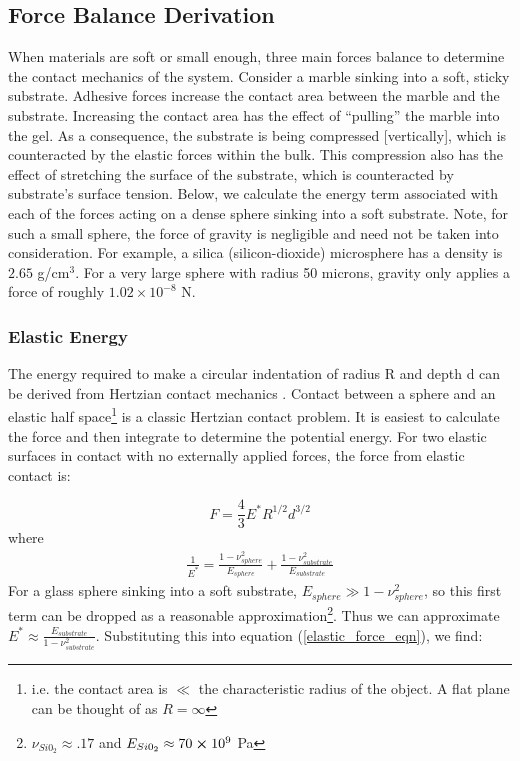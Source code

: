 \subsection{Force Balance Derivation}
When materials are soft or small enough, three main forces balance to determine the contact mechanics of the system. Consider a marble sinking into a soft, sticky substrate. Adhesive forces increase the contact area between the marble and the substrate. Increasing the contact area has the effect of ``pulling'' the marble into the gel. As a consequence, the substrate is being compressed [vertically], which is counteracted by the elastic forces within the bulk. This compression also has the effect of stretching the surface of the substrate, which is counteracted by substrate's surface tension. Below, we calculate the energy term associated with each of the forces acting on a dense sphere sinking into a soft substrate. Note, for such a small sphere, the force of gravity is negligible and need not be taken into consideration. For example, a silica (silicon-dioxide) microsphere has a density is $2.65$ g/cm$^3$. For a very large sphere with radius 50 microns, gravity only applies a force of roughly $ 1.02 \times 10^{-8} $ N.

\subsubsection{Elastic Energy}
The energy required to make a circular indentation of radius R and depth d can be derived from Hertzian contact mechanics \cite{hertz1882uber, style2013surface,cao2016nanoparticles}. Contact between a sphere and an elastic half space\footnote{i.e. the contact area is $ \ll $ the characteristic radius of the object. A flat plane can be thought of as $ R = \infty $}   is a classic Hertzian contact problem. It is easiest to calculate the force and then integrate to determine the potential energy. For two elastic surfaces in contact with no externally applied forces, the force from elastic contact is:

\begin{equation}
F = \frac{4}{3}E^*R^{1/2}d^{3/2}
\label{elastic_force_eqn}
\end{equation} 
where 
\begin{align*}
\frac{1}{E^*} = \frac{1-\nu_{sphere}^2}{E_{sphere}} + \frac{1-\nu_{substrate}^2}{E_{substrate}} 
\end{align*}
For a glass sphere sinking into a soft substrate, $ E_{sphere} \gg 1-\nu_{sphere}^2 $, so this first term can be dropped as a reasonable approximation\footnote{$\nu_{Si0_2} \approx .17 $ and $ E_{Si0_2} \approx 70 \cross 10^9 $ Pa}. Thus we can approximate $ E^* \approx \frac{E_{substrate}}{1-\nu_{substrate}^2} $. Substituting this into equation (\ref{elastic_force_eqn}), we find:

